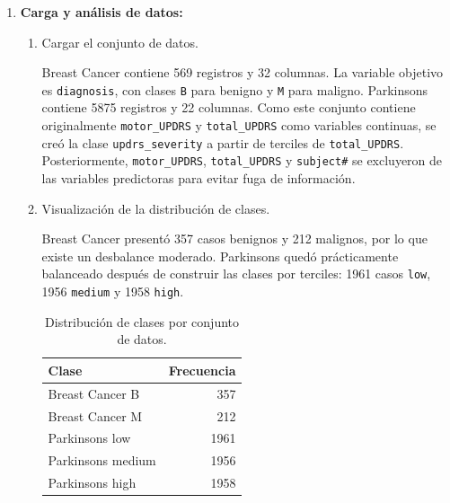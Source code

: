 \documentclass{article}
\begin{document}
\begin{enumerate}
  \item \textbf{Carga y análisis de datos:}
    \begin{enumerate}
      \item Cargar el conjunto de datos.

      Breast Cancer contiene 569 registros y 32 columnas. La variable objetivo es \texttt{diagnosis}, con clases \texttt{B} para benigno y \texttt{M} para maligno. Parkinsons contiene 5875 registros y 22 columnas. Como este conjunto contiene originalmente \texttt{motor\_UPDRS} y \texttt{total\_UPDRS} como variables continuas, se creó la clase \texttt{updrs\_severity} a partir de terciles de \texttt{total\_UPDRS}. Posteriormente, \texttt{motor\_UPDRS}, \texttt{total\_UPDRS} y \texttt{subject\#} se excluyeron de las variables predictoras para evitar fuga de información.

      \begin{table}[h!]
      \centering
      \caption{Resumen de los conjuntos de datos utilizados.}
      \end{table}

      \item Visualización de la distribución de clases.

      Breast Cancer presentó 357 casos benignos y 212 malignos, por lo que existe un desbalance moderado. Parkinsons quedó prácticamente balanceado después de construir las clases por terciles: 1961 casos \texttt{low}, 1956 \texttt{medium} y 1958 \texttt{high}.

      \begin{table}[h!]
      \centering
      \begin{tabular}{|l|r|}
      \hline
      \textbf{Clase} & \textbf{Frecuencia} \\
      \hline
      Breast Cancer B & 357 \\
      Breast Cancer M & 212 \\
      Parkinsons low & 1961 \\
      Parkinsons medium & 1956 \\
      Parkinsons high & 1958 \\
      \hline
      \end{tabular}
      \caption{Distribución de clases por conjunto de datos.}
      \end{table}


\end{enumerate}
\end{enumerate}
\end{document}
